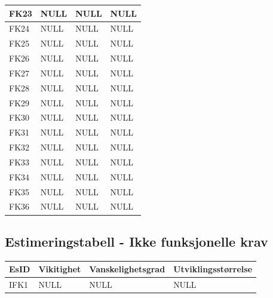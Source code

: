 \documentclass[12pt]{article}
\begin{document}
\begin{tabular}{|p{2cm}|p{4cm}|p{4cm}|p{4cm}| }
            \hline
            FK23 & NULL & NULL & NULL\\
            \hline
            FK24 & NULL & NULL & NULL\\
            \hline
            FK25 & NULL & NULL & NULL\\
            \hline
            FK26 & NULL & NULL & NULL\\
            \hline
            FK27 & NULL & NULL & NULL\\
            \hline
            FK28 & NULL & NULL & NULL\\
            \hline
            FK29 & NULL & NULL & NULL\\
            \hline
            FK30 & NULL & NULL & NULL\\
            \hline
            FK31 & NULL & NULL & NULL\\
            \hline
            FK32 & NULL & NULL & NULL\\
            \hline
            FK33 & NULL & NULL & NULL\\
            \hline
            FK34 & NULL & NULL & NULL\\
            \hline
            FK35 & NULL & NULL & NULL\\
            \hline
            FK36 & NULL & NULL & NULL\\
            \hline
        \end{tabular}

    \subsection{Estimeringstabell - Ikke funksjonelle krav}
        \begin{tabular}{|p{2cm}|p{4cm}|p{4cm}|p{4cm}| } 
            \hline
            \bf EsID & \bf Vikitighet & \bf Vanskelighetsgrad & \bf Utviklingsstørrelse\\
            \hline
            IFK1 & NULL & NULL & NULL\\
            \hline
        \end{tabular}
\end{document}

